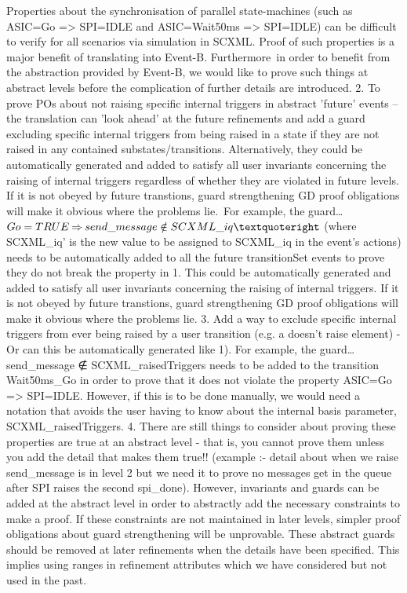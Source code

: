 Properties about the synchronisation of parallel state-machines (such as ASIC=Go => SPI=IDLE and ASIC=Wait50ms => SPI=IDLE) can be difficult to verify for all scenarios via simulation in SCXML. Proof of such properties is a major benefit of translating into Event-B.  Furthermore in order to benefit from the abstraction provided by Event-B, we would like to prove such things at abstract levels before the complication of further details are introduced. 
2.	To prove POs about not raising specific internal triggers in abstract 'future' events – the translation can 'look ahead' at the future refinements and add a guard excluding specific internal triggers from being raised in a state if they are not raised in any contained substates/transitions. Alternatively, they could be automatically generated and added to satisfy all user invariants concerning the raising of internal triggers regardless of whether they are violated in future levels. If it is not obeyed by future transtions, guard strengthening GD proof obligations will make it obvious where the problems lie. For example, the guard… 
     $Go = TRUE \limp send\_message \notin SCXML\_iq’$	
     (where SCXML\_iq’ is the new value to be assigned to SCXML\_iq in the event’s actions)
needs to be automatically added to all the future transitionSet events to prove they do not break the property in 1. This could be automatically generated and added to satisfy all user invariants concerning the raising of internal triggers. If it is not obeyed by future transtions, guard strengthening GD proof obligations will make it obvious where the problems lie.
3.	Add a way to exclude specific internal triggers from ever being raised by a user transition (e.g. a doesn't raise element) - Or can this be automatically generated like 1). For example, the guard… 
     send\_message ∉ SCXML\_raisedTriggers
needs to be added to the transition Wait50ms\_Go in order to prove that it does not violate the property ASIC=Go => SPI=IDLE. However, if this is to be done manually, we would need a notation that avoids the user having to know about the internal basis parameter, SCXML\_raisedTriggers.
4.	There are still things to consider about proving these properties are true at an abstract level - that is, you cannot prove them unless you add the detail that makes them true!! (example :- detail about when we raise send\_message is in level 2 but we need it to prove no messages get in the queue after SPI raises the second spi\_done). However, invariants and guards can be added at the abstract level in order to abstractly add the necessary constraints to make a proof. If these constraints are not maintained in later levels, simpler proof obligations about guard strengthening will be unprovable. These abstract guards should be removed at later refinements when the details have been specified. This implies using ranges in refinement attributes which we have considered but not used in the past.

